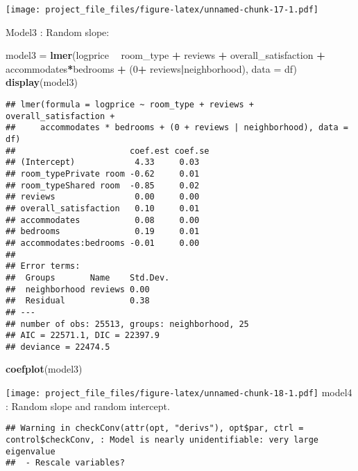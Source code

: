 \documentclass[]{article}
\newenvironment{Shaded}{\begin{snugshade}}{\end{snugshade}}
\newcommand{\KeywordTok}[1]{\textcolor[rgb]{0.13,0.29,0.53}{\textbf{#1}}}
\newcommand{\DataTypeTok}[1]{\textcolor[rgb]{0.13,0.29,0.53}{#1}}
\newcommand{\DecValTok}[1]{\textcolor[rgb]{0.00,0.00,0.81}{#1}}
\newcommand{\StringTok}[1]{\textcolor[rgb]{0.31,0.60,0.02}{#1}}
\newcommand{\OperatorTok}[1]{\textcolor[rgb]{0.81,0.36,0.00}{\textbf{#1}}}
\newcommand{\NormalTok}[1]{#1}
\begin{document}
\texttt{[image: project\_file\_files/figure-latex/unnamed-chunk-17-1.pdf]}

Model3 : Random slope:

\begin{Shaded}
\begin{Highlighting}[]
\NormalTok{model3 =}\StringTok{ }\KeywordTok{lmer}\NormalTok{(logprice }\OperatorTok{~}\StringTok{ }\NormalTok{room_type }\OperatorTok{+}\StringTok{ }\NormalTok{reviews }\OperatorTok{+}\StringTok{ }\NormalTok{overall_satisfaction }\OperatorTok{+}\StringTok{ }\NormalTok{accommodates}\OperatorTok{*}\NormalTok{bedrooms }\OperatorTok{+}\StringTok{ }\NormalTok{(}\DecValTok{0}\OperatorTok{+}\StringTok{ }\NormalTok{reviews}\OperatorTok{|}\NormalTok{neighborhood), }\DataTypeTok{data =}\NormalTok{ df)}
\KeywordTok{display}\NormalTok{(model3)}
\end{Highlighting}
\end{Shaded}

\begin{verbatim}
## lmer(formula = logprice ~ room_type + reviews + overall_satisfaction + 
##     accommodates * bedrooms + (0 + reviews | neighborhood), data = df)
##                       coef.est coef.se
## (Intercept)            4.33     0.03  
## room_typePrivate room -0.62     0.01  
## room_typeShared room  -0.85     0.02  
## reviews                0.00     0.00  
## overall_satisfaction   0.10     0.01  
## accommodates           0.08     0.00  
## bedrooms               0.19     0.01  
## accommodates:bedrooms -0.01     0.00  
## 
## Error terms:
##  Groups       Name    Std.Dev.
##  neighborhood reviews 0.00    
##  Residual             0.38    
## ---
## number of obs: 25513, groups: neighborhood, 25
## AIC = 22571.1, DIC = 22397.9
## deviance = 22474.5
\end{verbatim}

\begin{Shaded}
\begin{Highlighting}[]
\KeywordTok{coefplot}\NormalTok{(model3)}
\end{Highlighting}
\end{Shaded}

\texttt{[image: project\_file\_files/figure-latex/unnamed-chunk-18-1.pdf]}
model4 : Random slope and random intercept.

\begin{verbatim}
## Warning in checkConv(attr(opt, "derivs"), opt$par, ctrl = control$checkConv, : Model is nearly unidentifiable: very large eigenvalue
##  - Rescale variables?
\end{verbatim}
\end{document}

